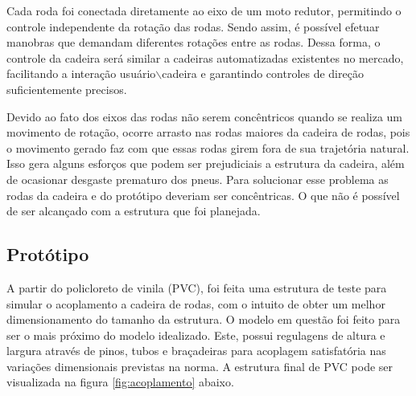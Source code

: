 
Cada roda foi conectada diretamente ao eixo de um moto redutor, permitindo o controle independente da rotação das rodas. Sendo assim, é possível efetuar manobras que demandam diferentes rotações entre as rodas. Dessa forma, o controle da cadeira será similar a cadeiras automatizadas existentes no mercado, facilitando a interação usuário$\backslash$cadeira e garantindo controles de direção suficientemente precisos.


Devido ao fato dos eixos das rodas não serem concêntricos quando se realiza um movimento de rotação, ocorre arrasto nas rodas maiores da cadeira de rodas, pois o movimento gerado faz com que essas rodas girem fora de sua trajetória natural. Isso gera alguns esforços que podem ser prejudiciais a estrutura da cadeira, além de ocasionar desgaste prematuro dos pneus. Para solucionar esse problema as rodas da cadeira e do protótipo deveriam ser concêntricas. O que não é possível de ser alcançado com a estrutura que foi planejada.


\subsection{Protótipo}

A partir do policloreto de vinila (PVC), foi feita uma estrutura de teste para simular o acoplamento a cadeira de rodas, com o intuito de obter um melhor dimensionamento do tamanho da estrutura. O modelo em questão foi feito para ser o mais próximo do modelo idealizado. Este, possui regulagens de altura e largura através de pinos, tubos e braçadeiras para acoplagem satisfatória nas variações dimensionais previstas na norma. A estrutura final de PVC pode ser visualizada na figura \ref{fig:acoplamento} abaixo.

